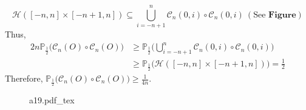 \documentclass[12pt,a4paper]{report}
\theoremstyle{definition}
\newcommand{\incfig}[1]{%
{#1.pdf_tex}
}
\begin{document}
\begin{enumerate}
\begin{enumerate}
        \[
        \mathcal{H}([-n,n]\times [-n+1,n])\subseteq \bigcup_{i=-n+1}^n\mathcal{C}_n(0,i)\circ \mathcal{C}_n(0,i)\ (\mbox{See }\mathbf{Figure})
        \]
        Thus, 
        \begin{align*}
        2n\mathbb{P}_{\frac{1}{2}}\big(\mathcal{C}_n(O)\circ\mathcal{C}_n(O)\big)&\geq \mathbb{P}_{\frac{1}{2}}\bigg(\bigcup_{i=-n+1}^n\mathcal{C}_n(0,i)\circ \mathcal{C}_n(0,i)\bigg)\\
        &\geq \mathbb{P}_{\frac{1}{2}}\big(\mathcal{H}([-n,n]\times [-n+1,n])\big)=\frac{1}{2}
        \end{align*}
        Therefore, $\mathbb{P}_{\frac{1}{2}}\big(\mathcal{C}_n(O)\circ\mathcal{C}_n(O)\big)\geq \frac{1}{4n}.$
        \newpage
    	\begin{figure}[htp]
    	\centering
        \def\svgwidth{12cm}
        \incfig{a19}
        \end{figure}
    \end{enumerate}
\end{enumerate}
\newpage
\end{document}
